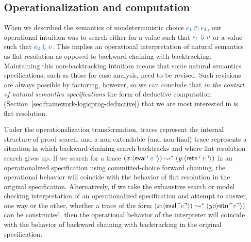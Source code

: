 

\subsection{Operationalization and computation}
\label{sec:flatresolution}

When we described the semantics of nondeterministic choice $\obj{e_1
  \arb e_2}$, our operational intuition was to search either for a
value such that $\obj{e_1 \Downarrow v}$ or a value such that
$\obj{e_2 \Downarrow v}$. This implies an operational interpretation
of natural semantics as flat resolution as opposed to backward
chaining with backtracking. Maintaining this non-backtracking
intuition means that some natural semantics specifications, such as
those for case analysis, need to be revised. Such revisions are always
possible by factoring, however, so we can conclude that {\it in the
  context of natural semantics specifications} the form of deductive
computation (Section~\ref{sec:framework-logicprog-deductive}) that we
are most interested in is flat resolution.

Under the operationalization transformation, traces represent the
internal structure of proof search, and a non-extendable (and
non-final) trace represents a situation in which backward chaining
search backtracks and where flat resolution search gives up. If we
search for a trace $(x{:}\susp{{\sf eval}\,\interp{e}}) \leadsto^*
(y{:}\susp{{\sf retn}\,\interp{v}})$ in an operationalized
specification using committed-choice forward chaining, the operational
behavior will coincide with the behavior of flat resolution in the
original specification. Alternatively, if we take the exhaustive search
or model checking
interpretation of an operationalized specification and attempt to
answer, one way or the other, whether a trace of the form
$(x{:}\susp{{\sf eval}\,\interp{e}}) \leadsto^* (y{:}\susp{{\sf
    retn}\,\interp{v}})$ can be constructed, then the operational
behavior of the interpreter will coincide with the behavior of
backward chaining with backtracking in the original specification.

